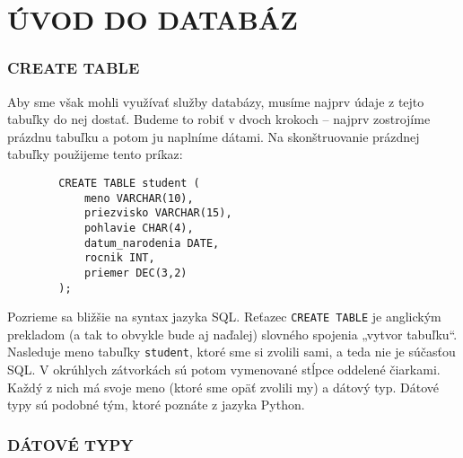 \documentclass[a4paper,11pt]{report}
\newcommand{\sqlkw}[1]{\texttt{\textcolor{sqlkeyword}{#1}}}
\begin{document}
	
	\chapter{ÚVOD DO DATABÁZ}
	
	\subsection*{CREATE TABLE}
	
	Aby sme však mohli využívať služby databázy, musíme najprv údaje z tejto tabuľky do nej dostať. Budeme to robiť v dvoch krokoch – najprv zostrojíme prázdnu tabuľku a potom ju naplníme dátami. Na skonštruovanie prázdnej tabuľky použijeme tento príkaz:
	
	\begin{verbatim}
		CREATE TABLE student (
			meno VARCHAR(10),
			priezvisko VARCHAR(15),
			pohlavie CHAR(4),
			datum_narodenia DATE,
			rocnik INT,	
			priemer DEC(3,2)
		);
	\end{verbatim}
	
	Pozrieme sa bližšie na syntax jazyka SQL. Reťazec \sqlkw{CREATE TABLE} je anglickým prekladom (a tak to obvykle bude aj naďalej) slovného spojenia „vytvor tabuľku“.
	Nasleduje meno tabuľky \texttt{student}, ktoré sme si zvolili sami, a teda nie je súčasťou SQL. V okrúhlych zátvorkách sú potom vymenované stĺpce oddelené čiarkami.
	Každý z nich má svoje meno (ktoré sme opäť zvolili my) a dátový typ. Dátové typy sú podobné tým, ktoré poznáte z jazyka Python. 
	
	\subsection*{DÁTOVÉ TYPY}
	
\end{document}
